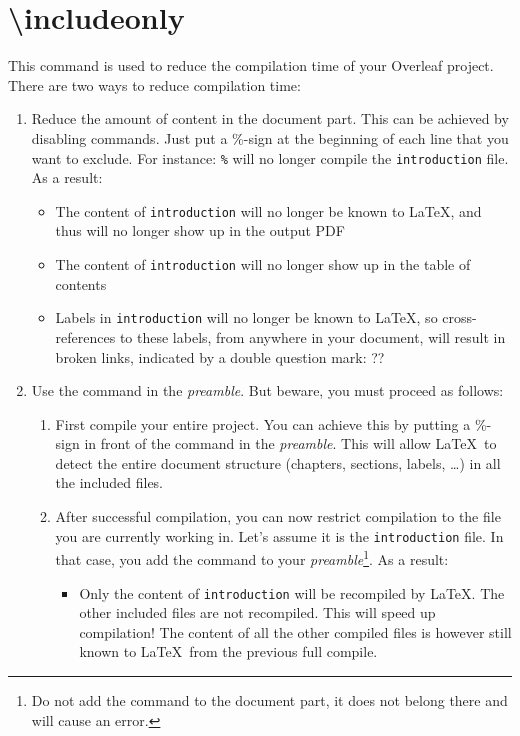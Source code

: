 \section{\textbackslash includeonly}
This command is used to reduce the compilation time of your Overleaf project. There are two ways to reduce compilation time:
\begin{enumerate}
    \item Reduce the amount of content in the document part. This can be achieved by disabling  commands. Just put a \%-sign at the beginning of each line that you want to exclude. For instance: 
    \verb|%| 
    will no longer compile the \verb|introduction| file. As a result:
        \begin{itemize}
            \item The content of \verb|introduction| will no longer be known to \LaTeX, and thus will no longer show up in the output PDF
            \item The content of \verb|introduction| will no longer show up in the table of contents
            \item Labels in \verb|introduction| will no longer be known to \LaTeX, so cross-references to these labels, from anywhere in your document, will result in broken links, indicated by a double question mark: ??
        \end{itemize}
    \item Use the command  in the \textit{preamble}. But beware, you must proceed as follows:
    \begin{enumerate}
        \item First compile your entire project. You can achieve this by putting a \%-sign in front of the  command in the \textit{preamble}. This will allow \LaTeX\ to detect the entire document structure (chapters, sections, labels, \dots) in all the included files.
        \item After successful compilation, you can now restrict compilation to the file you are currently working in. Let's assume it is the \verb|introduction| file. In that case, you add the command \verb|| to your \textit{preamble}\footnote{Do not add the  command to the document part, it does not belong there and will cause an error.}. As a result:
      \begin{itemize}
            \item Only the content of \verb|introduction| will be recompiled by \LaTeX. The other included files are not recompiled. This will speed up compilation! The content of all the other compiled files is however still known to \LaTeX\ from the previous full compile. 

\end{itemize}
\end{enumerate}
\end{enumerate}
